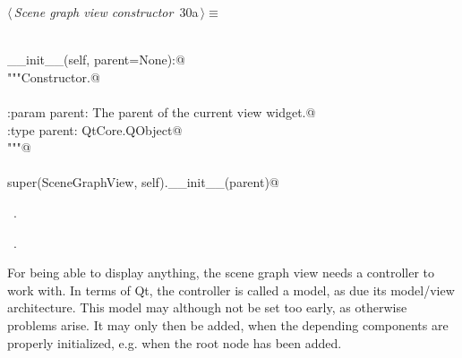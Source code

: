 \documentclass[
    a4paper,      %
    10pt,         %
    openright,    %
    notitlepage,  %
    parskip=half, %
]{scrreprt}       %
\theoremstyle{definition}                    %
\begin{document}
\begin{flushleft} \small
\begin{minipage}{\linewidth}\label{scrap32}\raggedright\small
{} $\langle\,${\itshape Scene graph view constructor}\nobreak\ {\footnotesize {30a}}$\,\rangle\equiv$
\vspace{-1exm}
\begin{list}{}{} \item
\mbox{}\lstinline@@\\
\mbox{}\lstinline@def __init__(self, parent=None):@\\
\mbox{}\lstinline@    """Constructor.@\\
\mbox{}\lstinline@@\\
\mbox{}\lstinline@    :param parent:        The parent of the current view widget.@\\
\mbox{}\lstinline@    :type parent:         QtCore.QObject@\\
\mbox{}\lstinline@    """@\\
\mbox{}\lstinline@@\\
\mbox{}\lstinline@    super(SceneGraphView, self).__init__(parent)@\\
\mbox{}\lstinline@@{\NWsep}
\end{list}
\vspace{-1.5ex}
\footnotesize
\begin{list}{}{\setlength{\itemsep}{-\parsep}\setlength{\itemindent}{-\leftmargin}}
\item \NWtxtMacroDefBy\ .
\item \NWtxtMacroRefIn\ .

\item{}
\end{list}
\end{minipage}\vspace{4ex}
\end{flushleft}
For being able to display anything, the scene graph view needs a controller to
work with. In terms of Qt, the controller is called a model, as due its
model/view architecture. This model may although not be set too early, as
otherwise problems arise. It may only then be added, when the depending
components are properly initialized, e.g. when the root node has been added.
\end{document}
